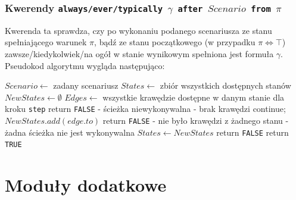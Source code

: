 \documentclass{article}
\begin{document}
\newpage

\subsubsection{Kwerendy \texttt{always/ever/typically $\gamma$ after $Scenario$ from $\pi$} }
Kwerenda ta sprawdza, czy po wykonaniu podanego scenariusza ze stanu spełniającego warunek $\pi$, bądź ze stanu początkowego (w przypadku $\pi \Leftrightarrow \top$) zawsze/kiedykolwiek/na ogół w stanie wynikowym spełniona jest formuła $\gamma$. Pseudokod algorytmu wygląda następująco:

\begin{algorithm}[H]
	\begin{algorithmic}
		\State $Scenario \gets $ zadany scenariusz
		\State $States \gets $ zbiór wszystkich dostępnych stanów
		\State $NewStates \gets \emptyset$
		\State $Edges \gets $ wszystkie krawędzie dostępne w danym stanie dla kroku \texttt{step}
		\State return \texttt{FALSE} - ścieżka niewykonywalna - brak krawędzi
		\EndIf
		continue;
		\EndIf
		\State $NewStates.add(edge.to)$
		\EndFor
		\EndFor
		\State return \texttt{FALSE} - nie było krawędzi z żadnego stanu - żadna ścieżka nie jest wykonywalna
		\EndIf
		\State $States \gets NewStates$
		\EndFor
		\State return \texttt{FALSE}
		\EndIf		
		\EndFor		
		\State return \texttt{TRUE}
		
	\end{algorithmic}
\end{algorithm}

\newpage
\section{Moduły dodatkowe}
\end{document}
